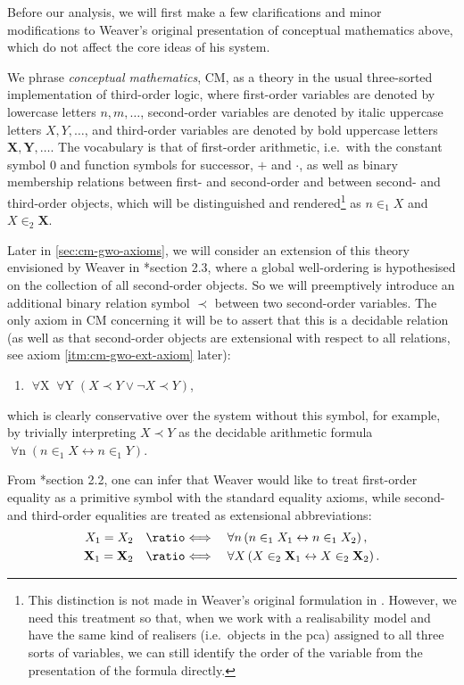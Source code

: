 \documentclass[12pt,openany]{book}
\makeatletter
\newcommand\inda[1]{\index{B@Arithmetic!#1}}
\theoremstyle{plain}
\theoremstyle{definition}
\newcommand\uplabel[1]{\textup{(#1)}}
\newcommand\opA[1]{\mathop{\forall #1}}
\newcommand\defeqv{\quad \ratio\Longleftrightarrow \quad}
\newcommand\CM{\mathrm{CM}}
\makeatother
\begin{document}
Before our analysis, we will first make a few clarifications and minor modifications to Weaver's original presentation of conceptual mathematics above, which do not affect the core ideas of his system.

We phrase \emph{conceptual mathematics}, $\CM$\inda{conceptual mathematics, $\CM$}, as a theory in the usual three-sorted implementation of third-order logic, where first-order variables are denoted by lowercase letters $n, m, \ldots$, second-order variables are denoted by italic uppercase letters $X, Y, \ldots$, and third-order variables are denoted by bold uppercase letters $\mathbf{X}, \mathbf{Y}, \ldots$. The vocabulary is that of first-order arithmetic, i.e.\ with the constant symbol $0$ and function symbols for successor, $+$ and $\cdot$, as well as binary membership relations between first- and second-order and between second- and third-order objects, which will be distinguished and rendered\footnote{This distinction is not made in Weaver's original formulation in \cite{weaver09-cm}. However, we need this treatment so that, when we work with a realisability model and have the same kind of realisers (i.e.\ objects in the pca) assigned to all three sorts of variables, we can still identify the order of the variable from the presentation of the formula directly.} as $n \in_1 X$ and $X \in_2 \mathbf{X}$.

Later in \autoref{sec:cm-gwo-axioms}, we will consider an extension of this theory envisioned by Weaver in \cite{weaver09-cm}*{section 2.3}, where a global well-ordering is hypothesised on the collection of all second-order objects. So we will preemptively introduce an additional binary relation symbol $\prec$ between two second-order variables. The only axiom in $\CM$ concerning it will be to assert that this is a decidable relation (as well as that second-order objects are extensional with respect to all relations, see axiom \ref{itm:cm-gwo-ext-axiom} later):
\begin{enumerate}[label=\uplabel{\arabic*},resume=cm-axioms]
  \item \label{itm:cm-gwo-dec-axiom} $\opA{X} \opA{Y} \left(X \prec Y \lor \neg X \prec Y\right)$,
\end{enumerate}
which is clearly conservative over the system without this symbol, for example, by trivially interpreting $X \prec Y$ as the decidable arithmetic formula $\opA{n} \left(n \in_1 X \leftrightarrow n \in_1 Y\right)$.

From \cite{weaver09-cm}*{section 2.2}, one can infer that Weaver would like to treat first-order equality as a primitive symbol with the standard equality axioms, while second- and third-order equalities are treated as extensional abbreviations:
\begin{align*}
  X_1 = X_2                   & \defeqv \opA{n} \left(n \in_1 X_1 \leftrightarrow n \in_1 X_2\right),                   \\
  \mathbf{X}_1 = \mathbf{X}_2 & \defeqv \opA{X} \left(X \in_2 \mathbf{X}_1 \leftrightarrow X \in_2 \mathbf{X}_2\right).
\end{align*}
\end{document}
